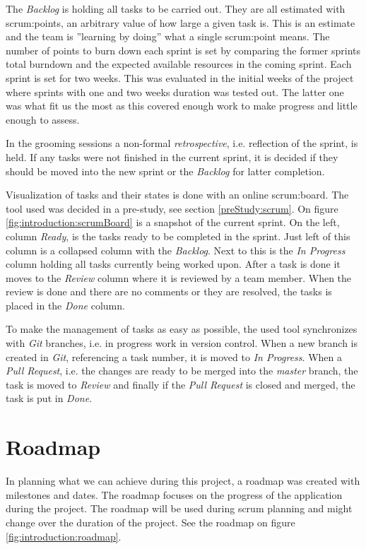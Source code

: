 The \textit{Backlog} is holding all tasks to be carried out.
They are all estimated with \glspl{scrum:point}, an arbitrary value of how large a given task is.
This is an estimate and the team is ''learning by doing'' what a single \gls{scrum:point} means.
The number of points to burn down each sprint is set by comparing the former sprints total burndown and the expected available resources in the coming sprint.
Each sprint is set for two weeks. 
This was evaluated in the initial weeks of the project where sprints with one and two weeks duration was tested out.
The latter one was what fit us the most as this covered enough work to make progress and little enough to assess.

In the grooming sessions a non-formal \textit{retrospective}, i.e. reflection of the sprint, is held. 
If any tasks were not finished in the current sprint, it is decided if they should be moved into the new sprint or the \textit{Backlog} for latter completion.

Visualization of tasks and their states is done with an online \gls{scrum:board}.
The tool used was decided in a pre-study, see section \ref{preStudy:scrum}.
On figure \ref{fig:introduction:scrumBoard} is a snapshot of the current sprint.
On the left, column \textit{Ready}, is the tasks ready to be completed in the sprint.
Just left of this column is a collapsed column with the \textit{Backlog}.
Next to this is the \textit{In Progress} column holding all tasks currently being worked upon.
After a task is done it moves to the \textit{Review} column where it is reviewed by a team member.
When the review is done and there are no comments or they are resolved, the tasks is placed in the \textit{Done} column.

To make the management of tasks as easy as possible, the used tool synchronizes with \textit{Git} branches, i.e. in progress work in version control. 
When a new branch is created in \textit{Git}, referencing a task number, it is moved to \textit{In Progress}. 
When a \textit{Pull Request}, i.e. the changes are ready to be merged into the \textit{master} branch, the task is moved to \textit{Review} and finally if the \textit{Pull Request} is closed and merged, the task is put in \textit{Done}.


\section*{Roadmap}
In planning what we can achieve during this project, a roadmap was created with milestones and dates. 
The roadmap focuses on the progress of the application during the project. 
The roadmap will be used during \gls{scrum} planning and might change over the duration of the project. 
See the roadmap on figure \ref{fig:introduction:roadmap}.

